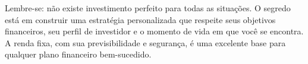\vspace{0.5cm}
\noindent Lembre-se: não existe investimento perfeito para todas as situações. O segredo está em construir uma estratégia personalizada que respeite seus objetivos financeiros, seu perfil de investidor e o momento de vida em que você se encontra. A renda fixa, com sua previsibilidade e segurança, é uma excelente base para qualquer plano financeiro bem-sucedido.
\vspace{1 cm}
\begin{center}
\end{center}